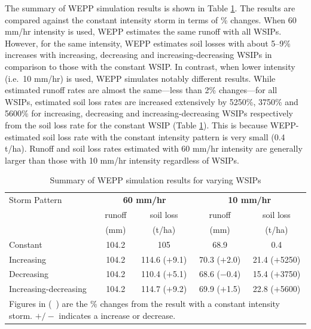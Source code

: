 The summary of WEPP simulation results is shown in Table
\ref{tab:WEPPSimulationResults}. The results are compared against the constant
intensity storm in terms of \% changes. When 60 mm/hr intensity is used, WEPP
estimates the same runoff with all WSIPs. However, for the same intensity, WEPP
estimates soil losses with about 5--9\% increases with increasing, decreasing
and increasing-decreasing WSIPs in comparison to those with the constant WSIP.
In contrast, when lower intensity (i.e.\ 10 mm/hr) is used, WEPP simulates
notably different results. While estimated runoff rates are almost the
same---less than 2\% changes---for all WSIPs, estimated soil loss rates are
increased extensively by 5250\%, 3750\% and 5600\% for increasing, decreasing
and increasing-decreasing WSIPs respectively from the soil loss rate for the
constant WSIP (Table \ref{tab:WEPPSimulationResults}). This is because
WEPP-estimated soil loss rate with the constant intensity pattern is
very small (0.4 t/ha). Runoff and soil loss rates estimated with 60
mm/hr intensity are generally larger than those with 10 mm/hr intensity
regardless of WSIPs.

\begin{table}[htbp]
  \caption{Summary of WEPP simulation results for varying WSIPs}
  \label{tab:WEPPSimulationResults}
  \centering
    \begin{tabular}{lcccc}
      \toprule
      Storm Pattern & \multicolumn{2}{c}{\textbf{60 mm/hr}} &
\multicolumn{2}{c}{\textbf{10 mm/hr}}\\
      \cmidrule(r){2-3} \cmidrule(l){4-5}
      & runoff  & soil loss  & runoff & soil loss\\
      & (mm) & (t/ha) & (mm) & (t/ha)\\
      \midrule
      Constant & 104.2 & 105 & 68.9 & 0.4\\
      Increasing & 104.2 & 114.6 ($+$9.1) & 70.3 ($+$2.0) & 21.4 ($+$5250)\\
      Decreasing & 104.2 & 110.4 ($+$5.1) & 68.6 ($-$0.4) & 15.4 ($+$3750)\\
      Increasing-decreasing & 104.2 & 114.7 ($+$9.2) & 69.9 ($+$1.5) & 22.8
($+$5600)\\
      \bottomrule
      \multicolumn{5}{p{10cm}}{\footnotesize Figures in (\ )
are the \% changes from the result with a constant intensity storm. $+/-$
indicates a increase or decrease.}\\
    \end{tabular}
\end{table}

